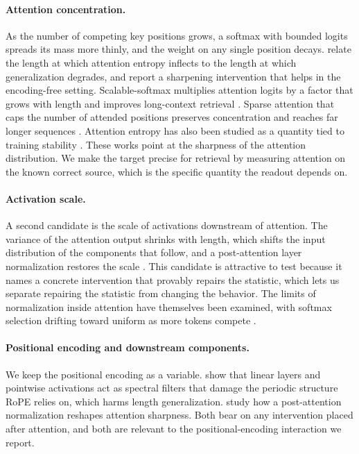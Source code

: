 \documentclass[letterpaper]{article} %
\begin{document}
\paragraph{Attention concentration.}
As the number of competing key positions grows, a softmax with bounded logits spreads its mass more
thinly, and the weight on any single position decays.
\citet{nopeentropy} relate the length at which attention entropy inflects to the length at which
generalization degrades, and report a sharpening intervention that helps in the encoding-free setting.
Scalable-softmax multiplies attention logits by a factor that grows with length and improves long-context
retrieval \citep{ssmax}.
Sparse attention that caps the number of attended positions preserves concentration and reaches far longer
sequences \citep{sparselong}.
Attention entropy has also been studied as a quantity tied to training stability \citep{zhai}.
These works point at the sharpness of the attention distribution.
We make the target precise for retrieval by measuring attention on the known correct source, which is the
specific quantity the readout depends on.

\paragraph{Activation scale.}
A second candidate is the scale of activations downstream of attention.
The variance of the attention output shrinks with length, which shifts the input distribution of the
components that follow, and a post-attention layer normalization restores the scale \citep{vanishingvariance}.
This candidate is attractive to test because it names a concrete intervention that provably repairs the
statistic, which lets us separate repairing the statistic from changing the behavior.
The limits of normalization inside attention have themselves been examined, with softmax selection drifting
toward uniform as more tokens compete \citep{mudarisov}.

\paragraph{Positional encoding and downstream components.}
We keep the positional encoding as a variable.
\citet{fope} show that linear layers and pointwise activations act as spectral filters that damage the
periodic structure RoPE relies on, which harms length generalization.
\citet{postnorm} study how a post-attention normalization reshapes attention sharpness.
Both bear on any intervention placed after attention, and both are relevant to the positional-encoding
interaction we report.
\end{document}
